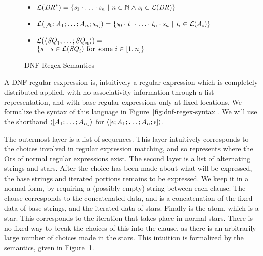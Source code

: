 \begin{figure}
\begin{itemize}
\item $\mathcal{L}(\mathit{DR}^*) =
\{\mathit{s}_1\cdot\ldots\cdot\mathit{s}_n ~|~ n\in\mathbb{N} \wedge \mathit{s}_i\in\mathcal{L}(\mathit{DR})\}$
\item $\mathcal{L}([\mathit{s}_0;\mathit{A}_1;\ldots;\mathit{A}_n;\mathit{s}_n])=
\{\mathit{s}_0\cdot\mathit{t}_1\cdot\ldots\cdot\mathit{t}_n\cdot\mathit{s}_n ~|~ \mathit{t}_i\in\mathcal{L}(\mathit{A}_i)\}$
\item $\mathcal{L}(\langle\mathit{SQ}_1;\ldots;\mathit{SQ}_n\rangle)=$\\
\hspace*{.5em}$\{\mathit{s} ~|~ \mathit{s} \in \mathcal{L}(\mathit{SQ}_i) \text{ for some $i\in[1,n]$}\}$
\end{itemize}
\caption{DNF Regex Semantics}
\label{fig:dnf-regex-semantics}
\end{figure}


A DNF regular esxpression is, intuitively
a regular expression which is completely distributed
applied, with no associativity information through a list representation,
and with base regular expressions only at fixed locations.
We formalize the syntax of this language in Figure~\ref{fig:dnf-regex-syntax}.
We will use the shorthand $\langle[\mathit{A}_1;\ldots;\mathit{A}_n]\rangle$
for $\langle[\epsilon;\mathit{A}_1;\ldots;\mathit{A}_n;\epsilon]\rangle$.

The outermost layer is a list of sequences.
This layer intuitively corresponds to the choices involved in regular expression matching, and so represents where the Ors of normal regular expressions exist.
The second layer is a list of alternating strings and stars.
After the choice has been made about what will be expressed,
the base strings and iterated portions remains to be expressed.
We keep it in a normal form, by requiring a (possibly empty) string between
each clause.
The clause corresponds to the concatenated data, and is a concatenation of the
fixed data of base strings, and the iterated data of stars.
Finally is the atom, which is a star.
This corresponds to the iteration that takes place in normal stars.
There is no fixed way to break the choices of this into the clause,
as there is an arbitrarily large number of choices made in the stars.
This intuition is formalized by the semantics, given in
Figure~\ref{fig:dnf-regex-semantics}.

